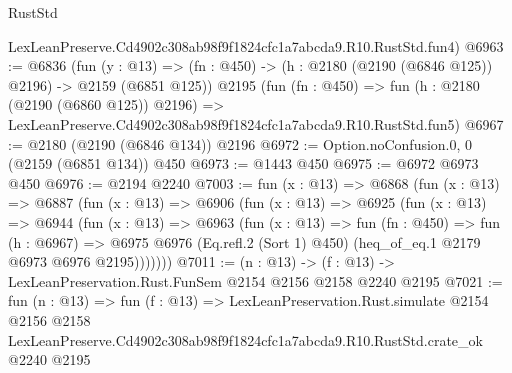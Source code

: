 \begin{lexlean}{RustStd}
\begin{coremodule}
    LexLeanPreserve.Cd4902c308ab98f9f1824cfc1a7abcda9.R10.RustStd.fun4)
@6963 := @6836
    (fun (y : @13) => (fn : @450) -> (h : @2180 (@2190 (@6846 @125)) @2196) -> @2159 (@6851 @125))
    @2195
    (fun (fn : @450) =>
    fun (h : @2180 (@2190 (@6860 @125)) @2196) =>
    LexLeanPreserve.Cd4902c308ab98f9f1824cfc1a7abcda9.R10.RustStd.fun5)
@6967 := @2180 (@2190 (@6846 @134)) @2196
@6972 := Option.noConfusion.{0, 0} (@2159 (@6851 @134)) @450
@6973 := @1443 @450
@6975 := @6972 @6973 @450
@6976 := @2194 @2240
@7003 := fun (x : @13) =>
  @6868
    (fun (x : @13) =>
    @6887
      (fun (x : @13) =>
      @6906
        (fun (x : @13) =>
        @6925
          (fun (x : @13) =>
          @6944
            (fun (x : @13) =>
            @6963
              (fun (x : @13) =>
              fun (fn : @450) =>
              fun (h : @6967) =>
              @6975 @6976 (Eq.refl.{2} (Sort 1) @450) (heq_of_eq.{1} @2179 @6973 @6976 @2195)))))))
@7011 := (n : @13) -> (f : @13) -> LexLeanPreservation.Rust.FunSem @2154 @2156 @2158 @2240 @2195
@7021 := fun (n : @13) =>
  fun (f : @13) =>
  LexLeanPreservation.Rust.simulate
    @2154
    @2156
    @2158
    LexLeanPreserve.Cd4902c308ab98f9f1824cfc1a7abcda9.R10.RustStd.crate_ok
    @2240
    @2195
\end{coremodule}
\end{lexlean}
